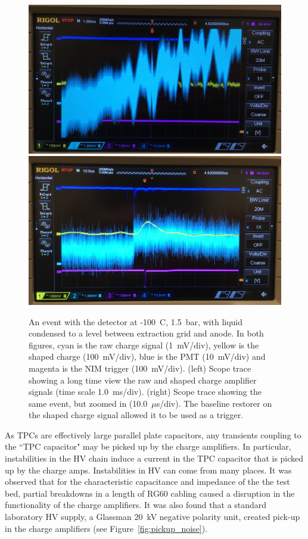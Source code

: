  \begin{figure}[htbp]
\begin{center}
\includegraphics[width = \halffig, keepaspectratio]{figures/testbed/baseline_wander.jpg}
\includegraphics[width = \halffig, keepaspectratio]{figures/testbed/baseline_wander_zoom.jpg}
\caption{An event with the detector at  -100~C, 1.5~bar, with liquid condensed to a level between extraction grid and anode. In both figures, cyan is the raw charge signal (1~mV/div), yellow is the shaped charge (100~mV/div), blue is the \acs{PMT} (10~mV/div) and magenta is the \acs{NIM} trigger (100~mV/div). (left) Scope trace showing a long time view the raw and shaped charge amplifier signals (time scale 1.0~ms/div). (right) Scope trace showing the same event, but zoomed in (10.0~$\mu$s/div). The baseline restorer on the shaped charge signal allowed it to be used as a trigger.}
\label{fig:amp_noise2}
\end{center}
\end{figure}


As \ac{TPC}s are effectively large parallel plate capacitors, any transients coupling to the ``\ac{TPC} capacitor" may be picked up by the charge amplifiers. In particular, instabilities in the \ac{HV} chain induce a current in the \ac{TPC} capacitor that is picked up by the charge amps. Instabilities in \ac{HV} can come from many places. It was observed that for the characteristic capacitance and impedance of the the test bed, partial breakdowns in a length of RG60 cabling caused a disruption in the functionality of the charge amplifiers. It was also found that a standard laboratory \ac{HV} supply, a Glassman 20~kV negative polarity unit, created pick-up in the charge amplifiers (see Figure~\ref{fig:pickup_noise}).  

